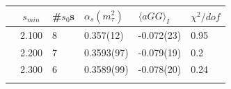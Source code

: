 \documentclass[../../index.tex]{subfiles}
\begin{document}
\begin{table}
  \centering
  \begin{tabularx}{\textwidth}{ccYYYY}
    \toprule
    & \(s_{min}\) & \#\(s_0\)s & \(\alpha_s(m_\tau^2)\) & \(\langle aGG \rangle_I\) & \(\chi^2/dof\)  \\
    \midrule
    \parbox[t]{2mm}{}
    & 2.100 & 8  & 0.357(12) & -0.072(23) & 0.95 \\
    & 2.200 &  7 & 
    0.3593(97) &  -0.079(19) &  0.2 \\
    &  2.300 &  6 & 
    0.3589(99) &  -0.078(20) &  0.24 \\
    \midrule
    \parbox[t]{2mm}{}

\end{tabularx}
\end{table}
\end{document}
